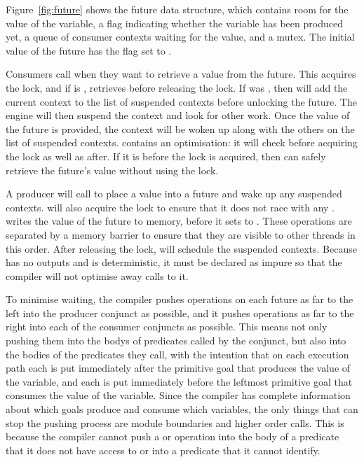 Figure~\ref{fig:future} shows the future data structure,
which contains room for the value of the variable,
a flag indicating whether the variable has been produced yet,
a queue of consumer contexts waiting for the value, and a mutex.
The initial value of the future has the flag set to
.

Consumers call \wait when they want to retrieve a value from the future.
This acquires the lock, and if  is 
, retrieves
 before releasing the lock.
If  was ,
then \wait will add the current context to
the list of suspended contexts before unlocking the future.
The engine will then suspend the context and look for other work.
Once the value of the future is provided,
the context will be woken up along with the others on the list of suspended
contexts.
\wait contains an optimisation:
it will check  before
acquiring the lock as well as after.
If it is  before the lock is acquired,
then \wait can safely retrieve the
future's value without using the lock.

A producer will call \signal to place a value into a future and wake up any
suspended contexts.
\signal will also acquire the lock to ensure that it does not race with any \wait.
\signal writes the value of the future to memory,
before it sets 
 to .
These operations are separated by a memory barrier to ensure that they are
visible to other threads in this order.
After releasing the lock, \signal will schedule the suspended contexts.
Because \signal has no outputs and is deterministic,
it must be declared as impure so that the compiler will not optimise away calls
to it.

To minimise waiting,
the compiler pushes \signal operations on each future
as far to the left into the producer conjunct as possible,
and it pushes \wait operations
as far to the right into each of the consumer conjuncts as possible.
This means not only pushing them
into the bodys of predicates called by the conjunct,
but also into the bodies of the predicates they call,
with the intention that on each execution path
each \signal is put immediately after
the primitive goal that produces the value of the variable,
and each \wait is put immediately before
the leftmost primitive goal that consumes the value of the variable.
Since the compiler has complete information
about which goals produce and consume which variables,
the only things that can stop the pushing process
are module boundaries and  higher order calls.
This is because
the compiler cannot push a \wait or \signal operation
into the body of a predicate that it does not have access to
or into a predicate that it cannot identify.

